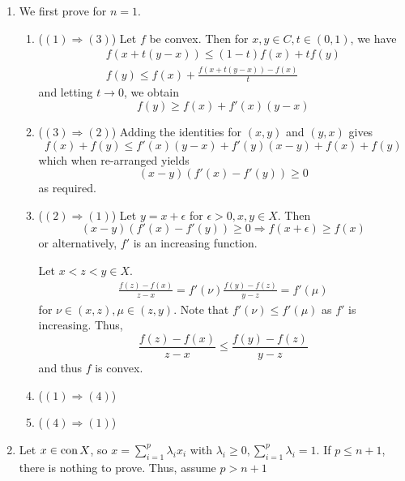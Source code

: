 \begin{enumerate}[label*=Ex \arabic*.]
\item \label{item:7}
  We first prove for $n = 1$.
  \begin{enumerate}
  \item ($(1) \Rightarrow (3)$)  Let $f$ be convex.  Then for $x, y
    \in C, t \in (0, 1)$, we have
    \begin{align}
      \label{eq:23}
      f(x + t(y-x)) \leq (1-t) f(x) + t f(y) \\
      f(y) \leq f(x) + \frac{f(x + t(y-x)) - f(x)}{t}
    \end{align} and letting $t \rightarrow 0$, we obtain
    \begin{equation}
      \label{eq:24}
      f(y) \geq f(x) + f'(x) (y - x)
    \end{equation}
  \item ($(3) \Rightarrow (2)$) Adding the identities for $(x, y)$ and
    $(y, x)$ gives
    \begin{equation}
      \label{eq:25}
      f(x) + f(y) \leq f'(x)(y - x) + f'(y)(x-y) + f(x) + f(y)
    \end{equation} which when re-arranged yields
    \begin{equation}
      \label{eq:26}
      (x-y)(f'(x) - f'(y)) \geq 0
    \end{equation} as required.
  \item ($(2) \Rightarrow (1)$) Let $y = x + \epsilon$ for $\epsilon >
    0, x, y \in X$.  Then
    \begin{equation}
      \label{eq:14}
      (x - y) (f'(x) - f'(y)) \geq 0 \Rightarrow f(x + \epsilon) \geq f(x)
    \end{equation} or alternatively, $f'$ is an increasing function.

    Let $x < z < y \in X$.
    \begin{align}
      \label{eq:29}
      \frac{f(z) - f(x)}{z-x} = f'(\nu)
      \frac{f(y) - f(z)}{y-z} = f'(\mu)
    \end{align} for $\nu \in (x, z), \mu \in (z, y)$. Note that
    $f'(\nu) \leq f'(\mu)$ as $f'$ is increasing.  Thus,
    \begin{equation}
      \label{eq:30}
      \frac{f(z) - f(x)}{z - x} \leq \frac{f(y) - f(z)}{y - z}
    \end{equation} and thus $f$ is convex.
  \item ($(1) \Rightarrow (4)$) 
  \item ($(4) \Rightarrow (1)$) 
  \end{enumerate}
\item \label{item:8}
  Let $x \in \operatorname*{con} X$, so $x = \sum_{i=1}^{p} \lambda_{i} x_{i}$ with
  $\lambda_{i} \geq 0, \sum_{i=1}^{p} \lambda_{i} = 1$. If $p \leq n +
  1$, there is nothing to prove.  Thus, assume $p > n + 1$


\end{enumerate}
